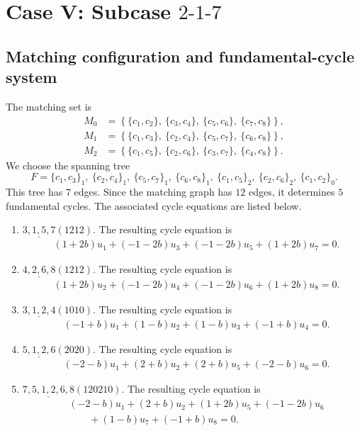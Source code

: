 \documentclass[11pt]{article}
\begin{document}
\section{Case V: Subcase $2\text{-}1\text{-}7$}
\subsection{Matching configuration and fundamental-cycle system}
The matching set is
\[
\begin{aligned}
M_0&=\left\{\{c_{1},c_{2}\},\ \{c_{3},c_{4}\},\ \{c_{5},c_{6}\},\ \{c_{7},c_{8}\}\right\},\\
M_1&=\left\{\{c_{1},c_{3}\},\ \{c_{2},c_{4}\},\ \{c_{5},c_{7}\},\ \{c_{6},c_{8}\}\right\},\\
M_2&=\left\{\{c_{1},c_{5}\},\ \{c_{2},c_{6}\},\ \{c_{3},c_{7}\},\ \{c_{4},c_{8}\}\right\}.
\end{aligned}
\]
We choose the spanning tree
\[
F={\{c_{1},c_{3}\}_{1},\ \{c_{2},c_{4}\}_{1},\ \{c_{5},c_{7}\}_{1},\ \{c_{6},c_{8}\}_{1},\ \{c_{1},c_{5}\}_{2},\ \{c_{2},c_{6}\}_{2},\ \{c_{1},c_{2}\}_{0}}.
\]
This tree has $7$ edges.  Since the matching graph has $12$ edges, it determines $5$ fundamental cycles.  The associated cycle equations are listed below.
\begin{enumerate}[label=(\arabic*)]
\item $ \underline{3,1,5,7}(1212) $.  The resulting cycle equation is
\[
\begin{aligned}
&\left(1 + 2b\right)u_{1} + \left(-1 - 2b\right)u_{3} + \left(-1 - 2b\right)u_{5} + \left(1 + 2b\right)u_{7}=0.
\end{aligned}
\]
\item $ \underline{4,2,6,8}(1212) $.  The resulting cycle equation is
\[
\begin{aligned}
&\left(1 + 2b\right)u_{2} + \left(-1 - 2b\right)u_{4} + \left(-1 - 2b\right)u_{6} + \left(1 + 2b\right)u_{8}=0.
\end{aligned}
\]
\item $ \underline{3,1,2,4}(1010) $.  The resulting cycle equation is
\[
\begin{aligned}
&\left(-1 + b\right)u_{1} + \left(1 - b\right)u_{2} + \left(1 - b\right)u_{3} + \left(-1 + b\right)u_{4}=0.
\end{aligned}
\]
\item $ \underline{5,1,2,6}(2020) $.  The resulting cycle equation is
\[
\begin{aligned}
&\left(-2 - b\right)u_{1} + \left(2 + b\right)u_{2} + \left(2 + b\right)u_{5} + \left(-2 - b\right)u_{6}=0.
\end{aligned}
\]
\item $ \underline{7,5,1,2,6,8}(120210) $.  The resulting cycle equation is
\[
\begin{aligned}
&\left(-2 - b\right)u_{1} + \left(2 + b\right)u_{2} + \left(1 + 2b\right)u_{5} + \left(-1 - 2b\right)u_{6}\\ &\qquad  + \left(1 - b\right)u_{7} + \left(-1 + b\right)u_{8}=0.
\end{aligned}
\]
\end{enumerate}
\end{document}
